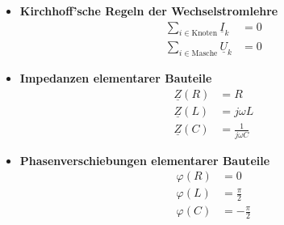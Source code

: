 \documentclass{article}
\begin{document}
	\begin{itemize}
		\item \textbf{Kirchhoff'sche Regeln der Wechselstromlehre}
			\begin{align}
				\sum_{i\in\text{Knoten}} \underline{I}_k &= 0 \\
				\sum_{i\in\text{Masche}} \underline{U}_k &= 0
			\end{align}
		
		
		\item \textbf{Impedanzen elementarer Bauteile}
			\begin{align}
				\underline{Z}(R) &= R \\
				\underline{Z}(L) &= j \omega L \\
				\underline{Z}(C) &= \frac{1}{j \omega C}
			\end{align}
		
		
		\item \textbf{Phasenverschiebungen elementarer Bauteile}
			\begin{align}
				\varphi(R) &= 0 \\
				\varphi(L) &= \frac{\pi}{2} \\
				\varphi(C) &= -\frac{\pi}{2}
			\end{align}
	\end{itemize}


\newpage
\end{document}
